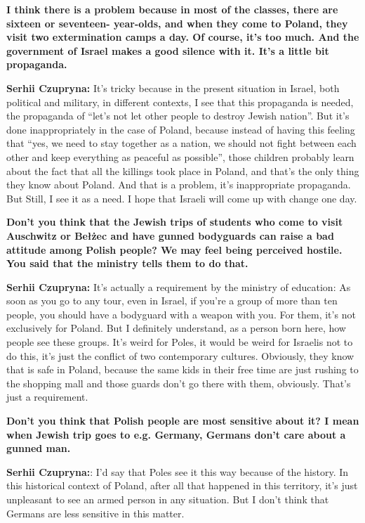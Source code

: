 \textbf{I think there is a problem because in most of the classes, there are sixteen or seventeen- year-olds, and when they come to Poland, they visit two extermination camps a day. Of course, it’s too much. And the government of Israel makes a good silence with it. It’s a little bit propaganda.}\par  
\textbf{Serhii Czupryna:} It’s tricky because in the present situation in Israel, both political and military, in different contexts, I see that this propaganda is needed, the propaganda of ``let’s not let other people to destroy Jewish nation''. But it’s done inappropriately in the case of Poland, because instead of having this feeling that ``yes, we need to stay together as a nation, we should not fight between each other and keep everything as peaceful as possible'', those children probably learn about the fact that all the killings took place in Poland, and that’s the only thing they know about Poland. And that is a problem, it’s inappropriate propaganda. But Still, I see it as a need. I hope that Israeli will come up with change one day. \par 
\textbf{Don’t you think that the Jewish trips of students who come to visit Auschwitz or Bełżec and have gunned bodyguards can raise a bad attitude among Polish people? We may feel being perceived hostile. You said that the ministry tells them to do that.}\par
\textbf{Serhii Czupryna:} It’s actually a requirement by the ministry of education: As soon as you go to any tour, even in Israel, if you’re a group of more than ten people, you should have a bodyguard with a weapon with you. For them, it’s not exclusively for Poland. But I definitely understand, as a person born here, how people see these groups. It’s weird for Poles, it would be weird for Israelis not to do this, it’s just the conflict of two contemporary cultures. Obviously, they know that is safe in Poland, because the same kids in their free time are just rushing to the shopping mall and those guards don’t go there with them, obviously. That’s just a requirement. \par
\textbf{Don’t you think that Polish people are most sensitive about it? I mean when Jewish trip goes to e.g. Germany, Germans don’t care about a gunned man.} \par
\textbf{Serhii Czupryna:}: I’d say that Poles see it this way because of the history. In this historical context of Poland, after all that happened in this territory, it’s just unpleasant to see an armed person in any situation. But I don’t think that Germans are less sensitive in this matter.\par
